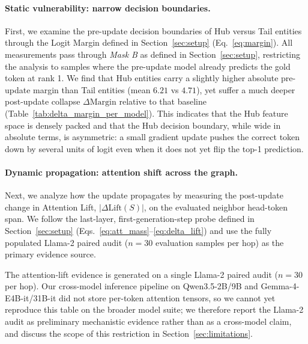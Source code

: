 \paragraph{Static vulnerability: narrow decision boundaries.}
First, we examine the pre-update decision boundaries of Hub versus Tail entities through the Logit Margin defined in Section~\ref{sec:setup} (Eq.~\ref{eq:margin}). All measurements pass through \emph{Mask B} as defined in Section~\ref{sec:setup}, restricting the analysis to samples where the pre-update model already predicts the gold token at rank 1. We find that Hub entities carry a slightly higher absolute pre-update margin than Tail entities (mean $6.21$ vs $4.71$), yet suffer a much deeper post-update collapse $\Delta\mathrm{Margin}$ relative to that baseline (Table~\ref{tab:delta_margin_per_model}). This indicates that the Hub feature space is densely packed and that the Hub decision boundary, while wide in absolute terms, is asymmetric: a small gradient update pushes the correct token down by several units of logit even when it does not yet flip the top-1 prediction.

\paragraph{Dynamic propagation: attention shift across the graph.}
Next, we analyze how the update propagates by measuring the post-update change in Attention Lift, $|\Delta \mathrm{Lift}(S)|$, on the evaluated neighbor head-token span. We follow the last-layer, first-generation-step probe defined in Section~\ref{sec:setup} (Eqs.~\ref{eq:att_mass}--\ref{eq:delta_lift}) and use the fully populated Llama-2 paired audit ($n=30$ evaluation samples per hop) as the primary evidence source.



The attention-lift evidence is generated on a single Llama-2 paired audit ($n{=}30$ per hop). Our cross-model inference pipeline on Qwen3.5-2B/9B and Gemma-4-E4B-it/31B-it did not store per-token attention tensors, so we cannot yet reproduce this table on the broader model suite; we therefore report the Llama-2 audit as preliminary mechanistic evidence rather than as a cross-model claim, and discuss the scope of this restriction in Section~\ref{sec:limitations}.

